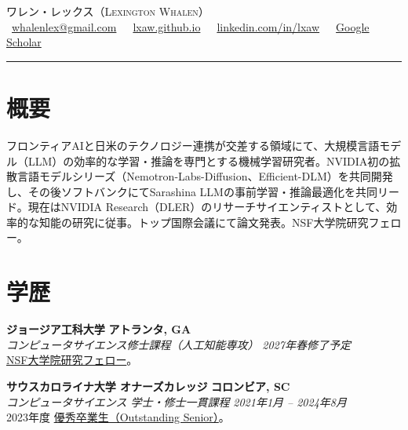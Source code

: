 \documentclass[10pt,a4paper]{article}
\newcommand{\cvlink}[2]{\href{#1}{#2}}
\newcommand{\entry}[4]{%
  \noindent\textbf{#1} \hfill \textbf{#2}\\
  \textit{#3} \hfill \textit{#4}%
}
\begin{document}
\begin{center}
  {\LARGE\scshape ワレン・レックス（Lexington Whalen）}\\[5pt]
  \faEnvelope\ \cvlink{mailto:whalenlex@gmail.com}{whalenlex@gmail.com} \,\textperiodcentered\,
  \faGlobe\ \cvlink{https://lxaw.github.io}{lxaw.github.io} \,\textperiodcentered\,
  \faLinkedin\ \cvlink{https://www.linkedin.com/in/lxaw/}{linkedin.com/in/lxaw} \,\textperiodcentered\,
  \faGraduationCap\ \cvlink{https://scholar.google.com/citations?user=FE17fUMAAAAJ&hl=en}{Google Scholar}\\[6pt]
  \rule{\textwidth}{0.8pt}
\end{center}

\section{概要}
フロンティアAIと日米のテクノロジー連携が交差する領域にて、大規模言語モデル（LLM）の効率的な学習・推論を専門とする機械学習研究者。NVIDIA初の拡散言語モデルシリーズ（Nemotron-Labs-Diffusion、Efficient-DLM）を共同開発し、その後ソフトバンクにてSarashina LLMの事前学習・推論最適化を共同リード。現在はNVIDIA Research（DLER）のリサーチサイエンティストとして、効率的な知能の研究に従事。トップ国際会議にて論文発表。NSF大学院研究フェロー。

\section{学歴}

\entry{ジョージア工科大学}{アトランタ, GA}{コンピュータサイエンス修士課程（人工知能専攻）}{2027年春修了予定}\\
{\footnotesize \cvlink{https://cse.sc.edu/news/lex-whalen-wins-nsf-graduate-research-fellowship}{NSF大学院研究フェロー}。}

\medskip
\entry{サウスカロライナ大学 オナーズカレッジ}{コロンビア, SC}{コンピュータサイエンス 学士・修士一貫課程}{2021年1月 -- 2024年8月}\\
{\footnotesize 2023年度 \cvlink{https://web.cse.sc.edu/news/outstanding-senior-award-2023}{優秀卒業生（Outstanding Senior）}。}

\end{document}
